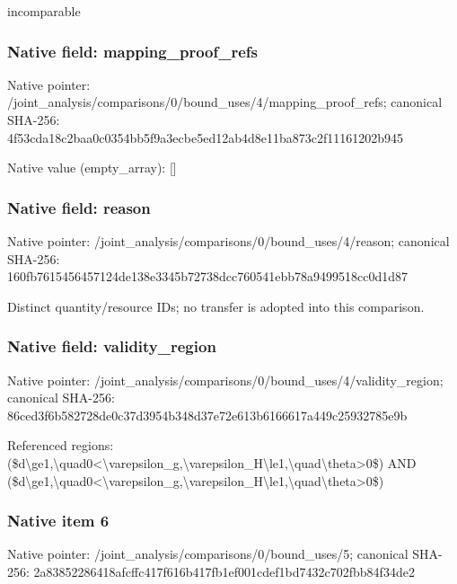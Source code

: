 \documentclass[10pt,a4paper]{article}
\begin{document}
\begingroup\raggedright\sloppy incomparable\par\endgroup

\subsubsection{Native field: mapping\_\allowbreak{}proof\_\allowbreak{}refs}
Native pointer: /joint\_\allowbreak{}analysis/comparisons/0/bound\_\allowbreak{}uses/4/mapping\_\allowbreak{}proof\_\allowbreak{}refs; canonical SHA-256: 4f53cda18c2baa0c0354bb5f9a3ecbe5ed12ab4d8e11ba873c2f11161202b945

Native value (empty\_\allowbreak{}array): []

\subsubsection{Native field: reason}
Native pointer: /joint\_\allowbreak{}analysis/comparisons/0/bound\_\allowbreak{}uses/4/reason; canonical SHA-256: 160fb7615456457124de138e3345b72738dcc760541ebb78a9499518cc0d1d87

\begingroup\raggedright\sloppy Distinct quantity/\allowbreak{}resource IDs;\allowbreak{} no transfer is adopted into this comparison.\par\endgroup

\subsubsection{Native field: validity\_\allowbreak{}region}
Native pointer: /joint\_\allowbreak{}analysis/comparisons/0/bound\_\allowbreak{}uses/4/validity\_\allowbreak{}region; canonical SHA-256: 86ced3f6b582728de0c37d3954b348d37e72e613b6166617a449c25932785e9b

\begingroup\raggedright\sloppy Referenced regions:\allowbreak{} (\$d\textbackslash{}ge1,\allowbreak{}\textbackslash{}quad0<\textbackslash{}varepsilon\_\allowbreak{}g,\allowbreak{}\textbackslash{}varepsilon\_\allowbreak{}H\textbackslash{}le1,\allowbreak{}\textbackslash{}quad\textbackslash{}theta>0\$) AND (\$d\textbackslash{}ge1,\allowbreak{}\textbackslash{}quad0<\textbackslash{}varepsilon\_\allowbreak{}g,\allowbreak{}\textbackslash{}varepsilon\_\allowbreak{}H\textbackslash{}le1,\allowbreak{}\textbackslash{}quad\textbackslash{}theta>0\$)\par\endgroup

\subsubsection{Native item 6}
Native pointer: /joint\_\allowbreak{}analysis/comparisons/0/bound\_\allowbreak{}uses/5; canonical SHA-256: 2a83852286418afcffc417f616b417fb1ef001cdef1bd7432c702fbb84f34de2
\end{document}
